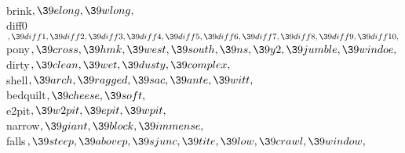 \\{brink}${},\39\\{elong},\39\\{wlong},{}$\6
\\{diff0}${},\39\\{diff1},\39\\{diff2},\39\\{diff3},\39\\{diff4},\39\\{diff5},\39\\{diff6},\39\\{diff7},\39\\{diff8},\39\\{diff9},\39\\{diff10},{}$\6
\\{pony}${},\39\\{cross},\39\\{hmk},\39\\{west},\39\\{south},\39\\{ns},\39\\{y2},\39\\{jumble},\39\\{windoe},{}$\6
\\{dirty}${},\39\\{clean},\39\\{wet},\39\\{dusty},\39\\{complex},{}$\6
\\{shell}${},\39\\{arch},\39\\{ragged},\39\\{sac},\39\\{ante},\39\\{witt},{}$\6
\\{bedquilt}${},\39\\{cheese},\39\\{soft},{}$\6
\\{e2pit}${},\39\\{w2pit},\39\\{epit},\39\\{wpit},{}$\6
\\{narrow}${},\39\\{giant},\39\\{block},\39\\{immense},{}$\6
\\{falls}${},\39\\{steep},\39\\{abovep},\39\\{sjunc},\39\\{tite},\39\\{low},\39\\{crawl},\39\\{window},{}$\6
